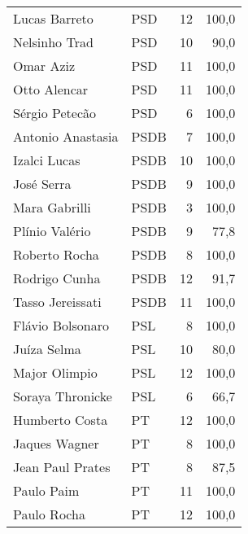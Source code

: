 \begin{longtable}{llrr}
           Lucas Barreto &            PSD &                  12 &        100,0 \\
           Nelsinho Trad &            PSD &                  10 &         90,0 \\
               Omar Aziz &            PSD &                  11 &        100,0 \\
            Otto Alencar &            PSD &                  11 &        100,0 \\
          Sérgio Petecão &            PSD &                   6 &        100,0 \\
       Antonio Anastasia &           PSDB &                   7 &        100,0 \\
            Izalci Lucas &           PSDB &                  10 &        100,0 \\
              José Serra &           PSDB &                   9 &        100,0 \\
           Mara Gabrilli &           PSDB &                   3 &        100,0 \\
          Plínio Valério &           PSDB &                   9 &         77,8 \\
           Roberto Rocha &           PSDB &                   8 &        100,0 \\
           Rodrigo Cunha &           PSDB &                  12 &         91,7 \\
        Tasso Jereissati &           PSDB &                  11 &        100,0 \\
        Flávio Bolsonaro &            PSL &                   8 &        100,0 \\
             Juíza Selma &            PSL &                  10 &         80,0 \\
           Major Olimpio &            PSL &                  12 &        100,0 \\
        Soraya Thronicke &            PSL &                   6 &         66,7 \\
          Humberto Costa &             PT &                  12 &        100,0 \\
           Jaques Wagner &             PT &                   8 &        100,0 \\
        Jean Paul Prates &             PT &                   8 &         87,5 \\
              Paulo Paim &             PT &                  11 &        100,0 \\
             Paulo Rocha &             PT &                  12 &        100,0 \\

\end{longtable}
